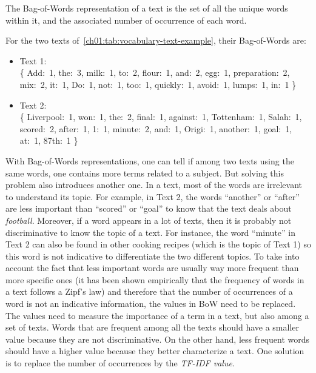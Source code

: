   \theoremstyle{definition}
  \begin{definition}
    \label{ch01:def:def-bow}
    The Bag-of-Words representation of a text is the set of all the unique words
    within it, and the associated number of occurrence of each word.
  \end{definition}

  \noindent For the two texts of~\autoref{ch01:tab:vocabulary-text-example},
  their Bag-of-Words are:

  \begin{itemize}
    \item Text 1: \\
      \{
      Add:~1,
      the:~3,
      milk:~1,
      to:~2,
      flour:~1,
      and:~2,
      egg:~1,
      preparation:~2,
      mix:~2,
      it:~1,
      Do:~1,
      not:~1,
      too:~1,
      quickly:~1,
      avoid:~1,
      lumps:~1,
      in:~1
      \}
    \item Text 2:\\
      \{
      Liverpool:~1,
      won:~1,
      the:~2,
      final:~1,
      against:~1,
      Tottenham:~1,
      Salah:~1,
      scored:~2,
      after:~1,
      1:~1,
      minute:~2,
      and:~1,
      Origi:~1,
      another:~1,
      goal:~1,
      at:~1,
      87th:~1
      \}
  \end{itemize}

  With Bag-of-Words representations, one can tell if among two texts using the
  same words, one contains more terms related to a subject. But solving this
  problem also introduces another one. In a text, most of the words are
  irrelevant to understand its topic. For example, in Text 2, the words
  ``another'' or ``after'' are less important than ``scored'' or ``goal'' to
  know that the text deals about \textit{football}. Moreover, if a word appears
  in a lot of texts, then it is probably not discriminative to know the topic of
  a text. For instance, the word ``minute'' in Text 2 can also be found in other
  cooking recipes (which is the topic of Text 1) so this word is not indicative
  to differentiate the two different topics. To take into account the fact that
  less important words are usually way more frequent than more specific ones (it
  has been shown empirically that the frequency of words in a text follows a
  Zipf's law) and therefore that the number of occurrences of a word is not an
  indicative information, the values in BoW need to be replaced. The values need
  to measure the importance of a term in a text, but also among a set of texts.
  Words that are frequent among all the texts should have a smaller value
  because they are not discriminative. On the other hand, less frequent words
  should have a higher value because they better characterize a text. One
  solution is to replace the number of occurrences by the \textit{TF-IDF value}.

